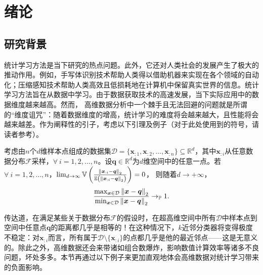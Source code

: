 \chapter{绪论}\label{chap:intro}
\section{研究背景}
统计学习方法是当下研究的热点问题。此外，它还对人类社会的发展产生了极大的推动作用。例如，手写体识别技术帮助人类得以借助机器来实现在各个领域的自动化；压缩感知技术帮助人类高效且低损耗地在计算机中保留真实世界的信息。统计学习方法旨在从数据中学习。由于数据获取技术的高速发展，当下实际应用中的数据维度越来越高。然而， 高维数据分析中一个棘手且无法回避的问题就是所谓的“维度诅咒”：随着数据维度的增高，统计学习的难度将会越来越大，且性能将会越来越差。作为阐释性的引子，考虑以下引理及例子（对于此处使用到的符号，请读者参考）。
\begin{lemma}\label{lemma:highdim}\kaishu
考虑由$n$个$d$维样本点组成的数据集$\mathcal{D}=\{\boldsymbol{x}_{:1},\allowbreak\boldsymbol{x}_{:2},\ldots,\allowbreak\boldsymbol{x}_{:n}\}\subseteq\mathbb{R}^{d}$，其中$\boldsymbol{x}_{:i}$从任意数据分布$\mathcal{F}$采样，$\forall~ i=1,2,\ldots,n$。设$\boldsymbol{q}\in\mathbb{R}^{d}$为$d$维空间中的任意一点。若$\forall~ i=1,2,\ldots,n$，$\lim_{d\rightarrow\infty}\mathbb{V}\left(\frac{\left\lVert\boldsymbol{x}_{:i}-\boldsymbol{q}\right\rVert_{2}}{\mathbb{E}\left(\left\lVert\boldsymbol{x}_{:i}-\boldsymbol{q}\right\rVert_{2}\right)}\right)=0$，
则随着$d\rightarrow +\infty$，
\begin{equation*}
    \frac{\max_{\boldsymbol{x}\in\mathcal{D}}\left\lVert\boldsymbol{x}-\boldsymbol{q}\right\rVert_{2}}{\min_{\boldsymbol{x}\in\mathcal{D}}\left\lVert\boldsymbol{x}-\boldsymbol{q}\right\rVert_{2}}\rightarrow_{\mathbb{P}}1.
\end{equation*}
\end{lemma}
传达道，在满足某些关于数据分布$\mathcal{F}$的假设时，在超高维空间中所有$\mathcal{D}$中样本点到空间中任意点$\boldsymbol{q}$的距离都几乎是相等的！在这种情况下，$k$近邻分类器将变得极度不稳定：对$\boldsymbol{x}_{:i}$而言，所有属于$\mathcal{D}\setminus\{\boldsymbol{x}_{:i}\}$的点都几乎是他的最近邻点——这是无意义的。除此之外，高维数据还会来带诸如组合数爆炸，影响数值计算效率等诸多不良问题，坏处多多。本节再通过以下例子来更加直观地体会高维数据对统计学习带来的负面影响。


